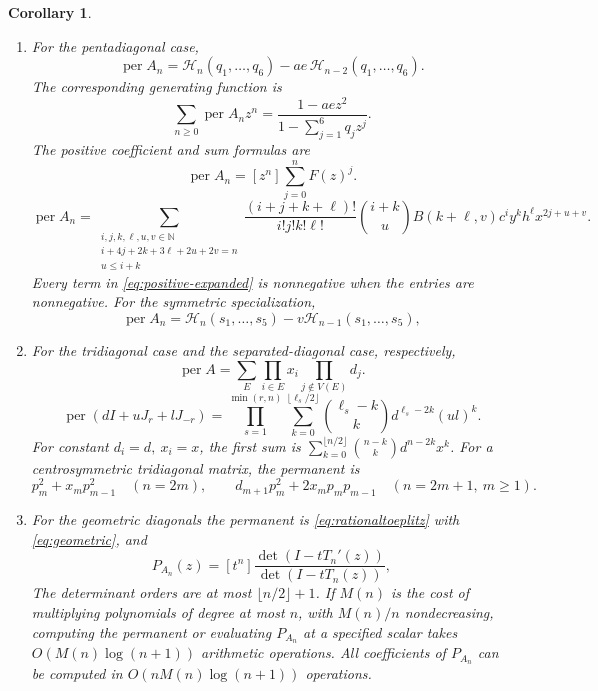 \documentclass[11pt,reqno]{amsart}
\newtheorem{corollary}[theorem]{Corollary}
\theoremstyle{remark}
\numberwithin{equation}{section}
\newcommand{\per}{\operatorname{per}}
\newcommand{\N}{\mathbb N}
\newcommand{\cH}{\mathcal H}
\begin{document}
\begin{corollary}
\begin{enumerate}
\item For the pentadiagonal case,
\begin{equation}\label{eq:penta-open}
 \per A_n=\cH_n(q_1,\ldots,q_6)-ae\,\cH_{n-2}(q_1,\ldots,q_6).
\end{equation}
The corresponding generating function is
\begin{equation}\label{eq:penta-gf}
 \sum_{n\ge0}\per A_n z^n=\frac{1-aez^2}{1-\sum_{j=1}^6 q_jz^j}.
\end{equation}
The positive coefficient and sum formulas are
\begin{equation}\label{eq:positive-five}
 \per A_n=[z^n]\sum_{j=0}^n F(z)^j.
\end{equation}
\begin{equation}\label{eq:positive-expanded}
 \per A_n=
 \sum_{\substack{i,j,k,\ell,u,v\in\N\\
                 i+4j+2k+3\ell+2u+2v=n\\u\leq i+k}}
  \frac{(i+j+k+\ell)!}{i!j!k!\ell!}\binom{i+k}{u}
  B(k+\ell,v)c^i y^k h^\ell x^{2j+u+v}.
\end{equation}
Every term in \eqref{eq:positive-expanded} is nonnegative when
the entries are nonnegative. For the symmetric specialization,
\begin{equation}\label{eq:symmetric}
 \per A_n=\cH_n(s_1,\ldots,s_5)-v\cH_{n-1}(s_1,\ldots,s_5),
\end{equation}

\item For the tridiagonal case and the separated-diagonal case,
respectively,
\begin{equation}\label{eq:tridiag}
 \per A=\sum_E\prod_{i\in E}x_i\prod_{j\notin V(E)}d_j.
\end{equation}
\begin{equation}\label{eq:tridiag-stride}
 \per(dI+uJ_r+lJ_{-r})=
 \prod_{s=1}^{\min(r,n)}
   \sum_{k=0}^{\lfloor\ell_s/2\rfloor}
       \binom{\ell_s-k}{k}d^{\ell_s-2k}(ul)^k .
\end{equation}
For constant \(d_i=d,\ x_i=x\), the first sum is
\(\sum_{k=0}^{\lfloor n/2\rfloor}\binom{n-k}{k}d^{n-2k}x^k\).
For a centrosymmetric tridiagonal matrix, the permanent is
\[
 p_m^2+x_m p_{m-1}^2\quad(n=2m),\qquad
 d_{m+1}p_m^2+2x_m p_m p_{m-1}\quad(n=2m+1,\ m\ge1).
\]

\item For the geometric diagonals the permanent is
\eqref{eq:rationaltoeplitz} with \eqref{eq:geometric}, and
\begin{equation}\label{eq:geometric-cycles}
 P_{A_n}(z)=[t^n]\frac{\det(I-tT_n'(z))}{\det(I-tT_n(z))},
\end{equation}
The determinant orders are at most \(\lfloor n/2\rfloor+1\).
If \(M(n)\) is the cost of multiplying polynomials of degree
at most \(n\), with \(M(n)/n\) nondecreasing, computing the
permanent or evaluating \(P_{A_n}\) at a specified scalar takes
\(O(M(n)\log(n+1))\) arithmetic operations. All coefficients of
\(P_{A_n}\) can be computed in \(O(nM(n)\log(n+1))\) operations.


\end{enumerate}
\end{corollary}
\end{document}
